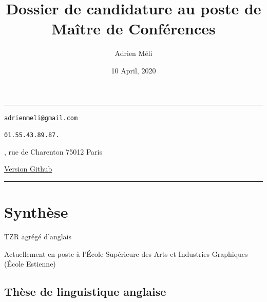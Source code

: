 \documentclass[
  10pt,
]{article}
\title{Dossier de candidature au poste de Maître de Conférences}
\author{Adrien Méli}
\date{10 April, 2020}
\begin{document}
\maketitle

{
\setcounter{tocdepth}{1}
\tableofcontents
}
\begin{center}\rule{0.5\linewidth}{0.5pt}\end{center}

\quad \faEnvira \quad \texttt{adrienmeli@gmail.com}

\quad \faPhone \quad \texttt{01.55.43.89.87.}

\quad \faEnvelope {}, rue de Charenton 75012 Paris

\href{https://adrienmeli.github.io/cv/}{\quad \faGithub \quad Version Github}

\begin{center}\rule{0.5\linewidth}{0.5pt}\end{center}

\pagebreak

\hypertarget{synthuxe8se}{%
\section{Synthèse}\label{synthuxe8se}}

TZR agrégé d'anglais

Actuellement en poste à l'École Supérieure des Arts et Industries Graphiques (École Estienne)

\hypertarget{thuxe8se-de-linguistique-anglaise}{%
\subsection{Thèse de linguistique anglaise}\label{thuxe8se-de-linguistique-anglaise}}
\end{document}
